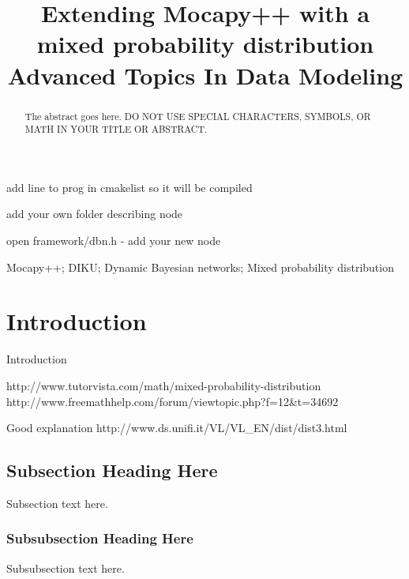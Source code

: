 \documentclass[10pt, conference, compsocconf,a4paper]{IEEEtran}
\begin{document}
\title{Extending Mocapy++ with a mixed probability distribution\\Advanced Topics In Data Modeling}


\author{
}

\maketitle


add line to prog in cmakelist so it will be compiled

add your own folder describing node

open framework/dbn.h - add your new node



\begin{abstract}
The abstract goes here. DO NOT USE SPECIAL CHARACTERS, SYMBOLS, OR MATH IN YOUR TITLE OR ABSTRACT.

\end{abstract}

\begin{IEEEkeywords}
Mocapy++; DIKU; Dynamic Bayesian networks; Mixed probability distribution

\end{IEEEkeywords}


\section{Introduction}
Introduction

http://www.tutorvista.com/math/mixed-probability-distribution
http://www.freemathhelp.com/forum/viewtopic.php?f=12&t=34692

Good explanation
http://www.ds.unifi.it/VL/VL_EN/dist/dist3.html

\subsection{Subsection Heading Here}
Subsection text here.

\subsubsection{Subsubsection Heading Here}
Subsubsection text here.
\end{document}
